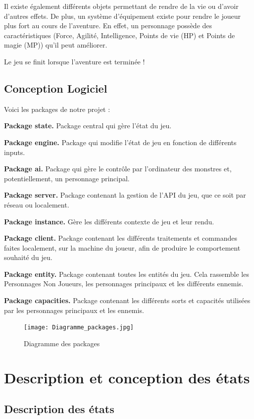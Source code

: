 \documentclass[12pt,a4paper]{report}
\begin{document}
Il existe \'{e}galement diff\'{e}rents objets permettant de rendre de la vie ou d'avoir d'autres effets. De plus, un système d'\'{e}quipement existe pour rendre le joueur plus fort au cours de l'aventure. En effet, un personnage possède des caract\'{e}ristiques (Force, Agilit\'{e}, Intelligence, Points de vie (HP) et Points de magie (MP)) qu'il peut am\'{e}liorer.

Le jeu se finit lorsque l'aventure est termin\'{e}e !
\section{Conception Logiciel}

Voici les packages de notre projet :

\textbf{Package state.} Package central qui gère l'\'{e}tat du jeu.

\textbf{Package engine.} Package qui modifie l'\'{e}tat de jeu en fonction de diff\'{e}rents inputs.

\textbf{Package ai.} Package qui gère le contrôle par l'ordinateur des monstres et, potentiellement, un personnage principal.

\textbf{Package server.} Package contenant la gestion de l'API du jeu, que ce soit par r\'{e}seau ou localement.

\textbf{Package instance.} Gère les différents contexte de jeu et leur rendu.

\textbf{Package client.} Package contenant les diff\'{e}rents traitements et commandes faites localement, sur la machine du joueur, afin de produire le comportement souhait\'{e} du jeu.

\textbf{Package entity.} Package contenant toutes les entit\'{e}s du jeu. Cela rassemble les Personnages Non Joueurs, les personnages principaux et les diff\'{e}rents ennemis.

\textbf{Package capacities.} Package contenant les diff\'{e}rents sorts et capacit\'{e}s utilis\'{e}es par les personnages principaux et les ennemis.

\begin{figure}
\caption{Diagramme des packages}
\texttt{[image: Diagramme\_packages.jpg]}
\end{figure}

\chapter{Description et conception des \'{e}tats}
\section{Description des \'{e}tats}
\end{document}
